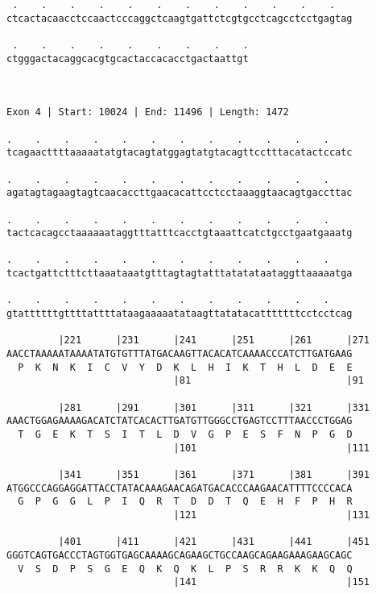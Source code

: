 \documentclass{article}
\begin{document}
\begin{Verbatim}
 .    .    .    .    .    .    .    .    .    .    .    .   
ctcactacaacctccaactcccaggctcaagtgattctcgtgcctcagcctcctgagtag
                                                            
 .    .    .    .    .    .    .    .    .
ctgggactacaggcacgtgcactaccacacctgactaattgt
                                          
                                          
 
Exon 4 | Start: 10024 | End: 11496 | Length: 1472
 
.    .    .    .    .    .    .    .    .    .    .    .    
tcagaacttttaaaaatatgtacagtatggagtatgtacagttcctttacatactccatc
                                                            
.    .    .    .    .    .    .    .    .    .    .    .    
agatagtagaagtagtcaacaccttgaacacattcctcctaaaggtaacagtgaccttac
                                                            
.    .    .    .    .    .    .    .    .    .    .    .    
tactcacagcctaaaaaataggtttatttcacctgtaaattcatctgcctgaatgaaatg
                                                            
.    .    .    .    .    .    .    .    .    .    .    .    
tcactgattctttcttaaataaatgtttagtagtatttatatataataggttaaaaatga
                                                            
.    .    .    .    .    .    .    .    .    .    .    .    
gtattttttgttttattttataagaaaaatataagttatatacatttttttcctcctcag
                                                            
         |221      |231      |241      |251      |261      |271
AACCTAAAAATAAAATATGTGTTTATGACAAGTTACACATCAAAACCCATCTTGATGAAG
  P  K  N  K  I  C  V  Y  D  K  L  H  I  K  T  H  L  D  E  E
                             |81                           |91
  
         |281      |291      |301      |311      |321      |331
AAACTGGAGAAAAGACATCTATCACACTTGATGTTGGGCCTGAGTCCTTTAACCCTGGAG
  T  G  E  K  T  S  I  T  L  D  V  G  P  E  S  F  N  P  G  D
                             |101                          |111
  
         |341      |351      |361      |371      |381      |391
ATGGCCCAGGAGGATTACCTATACAAAGAACAGATGACACCCAAGAACATTTTCCCCACA
  G  P  G  G  L  P  I  Q  R  T  D  D  T  Q  E  H  F  P  H  R
                             |121                          |131
  
         |401      |411      |421      |431      |441      |451
GGGTCAGTGACCCTAGTGGTGAGCAAAAGCAGAAGCTGCCAAGCAGAAGAAAGAAGCAGC
  V  S  D  P  S  G  E  Q  K  Q  K  L  P  S  R  R  K  K  Q  Q
                             |141                          |151
  

\end{Verbatim}
\end{document}
